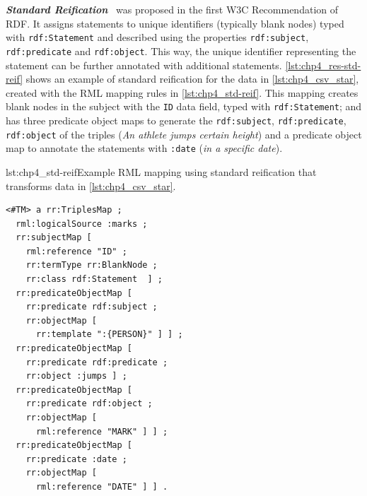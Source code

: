 

\noindent\textbf{\textit{Standard Reification}}~\citep{lassila1999rdf} was proposed in the first W3C Recommendation of RDF.
It assigns statements to unique identifiers (typically blank nodes) typed with \texttt{rdf:Statement} and described using the properties \texttt{rdf:subject}, \texttt{rdf:predicate} and \texttt{rdf:object}.
This way, the unique identifier representing the statement can be further annotated with additional statements. \cref{lst:chp4_res-std-reif} shows an example of standard reification for the data in \cref{lst:chp4_csv_star}, created with the RML mapping rules in \cref{lst:chp4_std-reif}. 
This mapping creates blank nodes in the subject with the \texttt{ID} data field, typed with \texttt{rdf:Statement}; and has three predicate object maps to generate the \texttt{rdf:subject}, \texttt{rdf:predicate}, \texttt{rdf:object} of the triples (\textit{An athlete jumps certain height}) and a predicate object map to annotate the statements with \texttt{:date} (\textit{in a specific date}).




\begin{minipage}{\linewidth}
\begin{captionedlisting}{lst:chp4_std-reif}{Example RML mapping using standard reification that transforms data in \cref{lst:chp4_csv_star}.}
\centering
\begin{multicols}{2}
{\begin{lstlisting}[basicstyle=\ttfamily\small,label={list:example1},columns=flexible]
<#TM> a rr:TriplesMap ;
  rml:logicalSource :marks ;
  rr:subjectMap [ 
    rml:reference "ID" ;
    rr:termType rr:BlankNode ;
    rr:class rdf:Statement  ] ;
  rr:predicateObjectMap [ 
    rr:predicate rdf:subject ;
    rr:objectMap [
      rr:template ":{PERSON}" ] ] ;
  rr:predicateObjectMap [ 
    rr:predicate rdf:predicate ;
    rr:object :jumps ] ;
  rr:predicateObjectMap [ 
    rr:predicate rdf:object ;
    rr:objectMap [
      rml:reference "MARK" ] ] ;
  rr:predicateObjectMap [ 
    rr:predicate :date ;
    rr:objectMap [
      rml:reference "DATE" ] ] .
\end{lstlisting}}
\end{multicols}
\end{captionedlisting}
\end{minipage}

